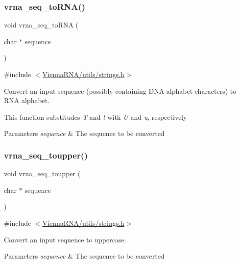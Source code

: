 \subsubsection{\texorpdfstring{vrna\_seq\_toRNA()}{vrna\_seq\_toRNA()}}
{\footnotesize\ttfamily void vrna\+\_\+seq\+\_\+to\+R\+NA (\begin{DoxyParamCaption}\item[{char $\ast$}]{sequence }\end{DoxyParamCaption})}



{\ttfamily \#include $<$\mbox{\hyperlink{strings_8h}{Vienna\+R\+N\+A/utils/strings.\+h}}$>$}



Convert an input sequence (possibly containing D\+NA alphabet characters) to R\+NA alphabet. 

This function substitudes {\itshape T} and {\itshape t} with {\itshape U} and {\itshape u}, respectively


\begin{DoxyParams}{Parameters}
{\em sequence} & The sequence to be converted \\
\hline
\end{DoxyParams}
\mbox{\label{group__string__utils_ga4f44dca03c9d708d68e64c0610bb9091}} 
\subsubsection{\texorpdfstring{vrna\_seq\_toupper()}{vrna\_seq\_toupper()}}
{\footnotesize\ttfamily void vrna\+\_\+seq\+\_\+toupper (\begin{DoxyParamCaption}\item[{char $\ast$}]{sequence }\end{DoxyParamCaption})}



{\ttfamily \#include $<$\mbox{\hyperlink{strings_8h}{Vienna\+R\+N\+A/utils/strings.\+h}}$>$}



Convert an input sequence to uppercase. 


\begin{DoxyParams}{Parameters}
{\em sequence} & The sequence to be converted \\
\hline
\end{DoxyParams}
\mbox{\label{group__string__utils_ga0d031df5266328fe455e244e094634fd}} 
